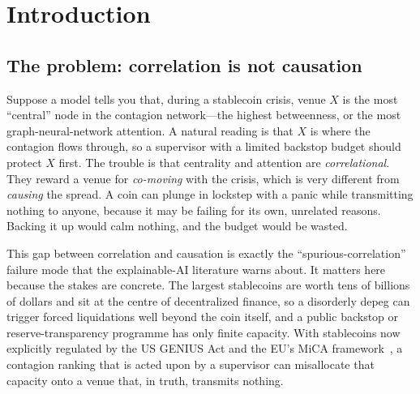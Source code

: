 \documentclass[sigconf,anonymous]{acmart}
\begin{document}

\maketitle

\section{Introduction}

\subsection{The problem: correlation is not causation}
Suppose a model tells you that, during a stablecoin crisis, venue $X$ is the most ``central'' node
in the contagion network---the highest betweenness, or the most graph-neural-network
attention. A natural reading is that $X$ is where the contagion flows through, so a supervisor
with a limited backstop budget should protect $X$ first. The trouble is that centrality and
attention are \emph{correlational}. They reward a venue for \emph{co-moving} with the crisis, which
is very different from \emph{causing} the spread. A coin can plunge in lockstep with a panic while
transmitting nothing to anyone, because it may be failing for its own, unrelated reasons. Backing it up
would calm nothing, and the budget would be wasted.

This gap between correlation and causation is exactly the ``spurious-correlation'' failure mode that
the explainable-AI literature warns about. It matters here because the stakes are concrete. The largest
stablecoins are worth tens of billions of dollars and sit at the centre of decentralized finance, so a
disorderly depeg can trigger forced liquidations well beyond the coin itself, and a public backstop or
reserve-transparency programme has only finite capacity. With stablecoins now explicitly regulated by
the US GENIUS Act and the EU's MiCA framework~\cite{genius2025,mica2023}, a contagion ranking that is
acted upon by a supervisor can misallocate that capacity onto a venue that, in truth, transmits nothing.
\end{document}
